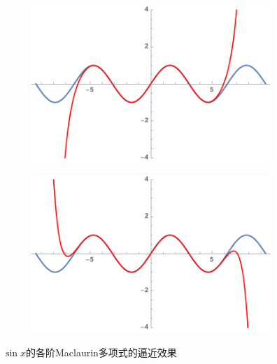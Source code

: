 \begin{figure}[h]
\begin{subfigure}[t]{0.24\textwidth}
	\end{subfigure}
	\begin{subfigure}[t]{0.24\textwidth}
		\centering
		\includegraphics[width=\textwidth]{./Images/Ch03/sinP13.pdf}
	\end{subfigure}
	\begin{subfigure}[t]{0.24\textwidth}
		\centering
		\includegraphics[width=\textwidth]{./Images/Ch03/sinP15.pdf}
	\end{subfigure}
	\caption{$\sin x$的各阶Maclaurin多项式的逼近效果}
	\label{fig:sinPn}
\end{figure}



